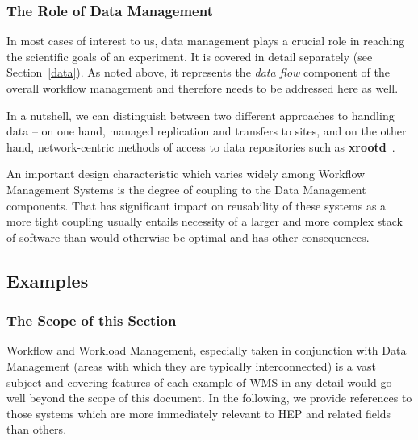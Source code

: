 \subsubsection{The Role of Data Management}
In most cases of interest to us, data management plays a crucial role in reaching the scientific goals of an experiment. It is covered in detail separately (see Section~\ref{data}).
As noted above, it represents the \textit{data flow} component of the overall workflow management and therefore needs to be addressed here as well.

In a nutshell, we can distinguish between two different approaches to handling data -- on one hand, managed replication and transfers to sites, and on the other hand, network-centric
methods of access to data repositories such as \textbf{xrootd}~\cite{xrootd,xrootd_web}.

An important design characteristic which varies widely among Workflow Management Systems is the degree of coupling to the Data Management components. That has significant impact
on reusability of these systems as a more tight coupling usually entails necessity of a larger and more complex stack of software than would otherwise be optimal and has other consequences.

\subsection{Examples}
\label{wms_examples}
\subsubsection{The Scope of this Section}
Workflow and Workload Management, especially taken in conjunction with Data Management (areas with which they are typically interconnected) is a vast
subject and  covering features of each example of WMS in any detail would go well beyond the scope of this document. In the following, we provide references
to those systems which are more immediately relevant to HEP and related fields than others.

